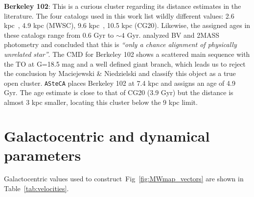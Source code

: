 \documentclass[draft]{aa}
\begin{document}
\begin{appendix}
  \noindent \textbf{Berkeley 102}: This is a curious cluster regarding its distance
  estimates in the literature. The four catalogs used in this work list wildly
  different values: 2.6 kpc~\citep[WEBDA;][]{Tadross_2008}, 4.9 kpc (MWSC),
  9.6 kpc~\citep[OC02;][]{Hasegawa_2008}, 10.5 kpc (CG20). Likewise, the
  assigned ages in these catalogs range from 0.6 Gyr to $\sim4$ Gyr.
  \cite{Maciejewski_2008} analyzed BV and 2MASS photometry and concluded that
  this is \emph{``only a chance alignment of physically unrelated star''}.
  The CMD for Berkeley 102 shows a scattered main sequence with the TO at G=18.5
  mag and a well defined giant branch, which leads us to reject the conclusion
  by Maciejewski \& Niedzielski and classify this object as a true open cluster.
  \texttt{ASteCA} places Berkeley 102 at 7.4 kpc and assigns an age of 4.9 Gyr.
  The age estimate is close to that of CG20 (3.9 Gyr) but the distance is
  almost 3 kpc smaller, locating this cluster below the 9 kpc limit.\\


\FloatBarrier
\section{Galactocentric and dynamical parameters}
  \label{app:galac_dynam}

  Galactocentric values used to construct~Fig~\ref{fig:MWmap_vectors} are shown
  in Table~\ref{tab:velocities}.


\end{appendix}
\end{document}
